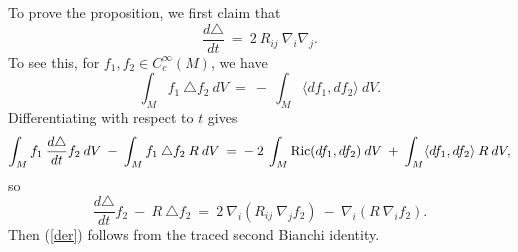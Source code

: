 To prove the proposition, we first claim that
\begin{equation} \label{der}
\frac{d\triangle}{dt} \: = \: 2 \: R_{ij} \: \nabla_i \nabla_j.
\end{equation}
To see this, for $f_1, f_2 \in C^\infty_c(M)$, we have
\begin{equation}
\int_M f_1 \: \triangle f_2 \: dV \: = \: - \:
\int_M \langle df_1, df_2 \rangle \: dV.
\end{equation}
Differentiating with respect to $t$ gives
\begin{equation}
\int_M f_1 \: \frac{d\triangle}{dt} f_2 \: dV \: - \:
\int_M f_1 \: \triangle f_2 \: R \: dV
\: = \: - \: 2 \:
\int_M \operatorname{Ric}(df_1, df_2) \: dV
\: + \: \int_M \langle df_1, df_2 \rangle \: R \: dV,
\end{equation}
so
\begin{equation}
\frac{d\triangle}{dt} f_2 \: - \:
R \: \triangle f_2
\: = \: 2 \: \nabla_i (R_{ij} \: \nabla_j f_2)
\: - \: \nabla_i (R \:  \nabla_i f_2).
\end{equation}
Then (\ref{der}) follows from the traced second Bianchi identity.

